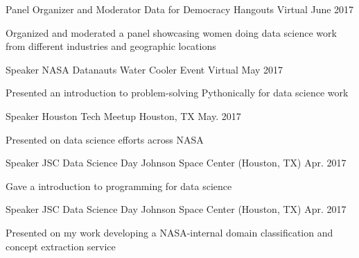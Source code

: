 

\begin{cventries}

  \cventry
    {Panel Organizer and Moderator} %
    {Data for Democracy Hangouts} %
    {Virtual} %
    {June 2017} %
    {
      \begin{cvitems} %
        \item {Organized and moderated a panel showcasing women doing data science work from different industries and geographic locations}
      \end{cvitems}
    }
    
  \cventry
    {Speaker} %
    {NASA Datanauts Water Cooler Event} %
    {Virtual} %
    {May 2017} %
    {
      \begin{cvitems} %
        \item {Presented an introduction to problem-solving Pythonically for data science work}
      \end{cvitems}
    }
    
    
  \cventry
    {Speaker} %
    {Houston Tech Meetup} %
    {Houston, TX} %
    {May. 2017} %
    {
      \begin{cvitems} %
        \item {Presented on data science efforts across NASA}
      \end{cvitems}
    }

  \cventry
    {Speaker} %
    {JSC Data Science Day} %
    {Johnson Space Center (Houston, TX)} %
    {Apr. 2017} %
    {
      \begin{cvitems} %
        \item {Gave a introduction to programming for data science}
      \end{cvitems}
    }

  \cventry
    {Speaker} %
    {JSC Data Science Day} %
    {Johnson Space Center (Houston, TX)} %
    {Apr. 2017} %
    {
      \begin{cvitems} %
        \item {Presented on my work developing a NASA-internal domain classification and concept extraction service}
      \end{cvitems}
    }
    
\end{cventries}

